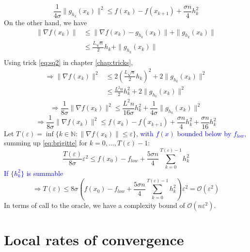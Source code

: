 \documentclass[12pt, openany]{report}
\renewcommand{\O}{\mathcal{O}}
\theoremstyle{definition}
\begin{document}
\begin{equation}
	\frac{1}{4\sigma} \|g_{h_k}(x_k)\|^2 \leq f(x_k) - f(x_{k+1}) + \frac{\sigma n}{4} h_k^2
\end{equation}
On the other hand, we have
\begin{equation}
	\begin{aligned}
		\|\nabla f(x_k)\| &\leq \|\nabla f(x_k) - g_{h_k}(x_k)\| + \|g_{h_k}(x_k)\|\\
		&\leq \frac{L \sqrt{n}}{2} h_k + \|g_{h_k}(x_k)\|\\
	\end{aligned}
\end{equation}
Using trick \eqref{eq:sq2} in chapter \ref{chap:tricks},
\begin{equation}
	\begin{aligned}
		\Longrightarrow \|\nabla f(x_k)\|^2 &\leq 2 \left( \frac{L \sqrt{n}}{2} h_k \right)^2 + 2 \|g_{h_k}(x_k)\|^2\\
		&\leq \frac{L^2 n}{2} h_k^2 + 2 \|g_{h_k}(x_k)\|^2 
	\end{aligned}
\end{equation}
\begin{equation}
	\Longrightarrow \frac{1}{8 \sigma} \|\nabla f(x_k)\|^2 \leq \frac{L^2n}{16\sigma} h_k^2 + \frac{1}{4\sigma} \|g_{h_k}(x_k)\|^2
\end{equation}
\begin{equation}\label{eq:brigitte}
	\Longrightarrow \frac{1}{8 \sigma} \|\nabla f(x_k)\|^2 \leq f(x_k) - f(x_{k+1}) + \frac{\sigma n}{4} h_k^2 + \frac{\sigma n}{16}h_k^2
\end{equation}
Let $T(\varepsilon) = \inf \{k\in \mathbb{N}: \|\nabla f(x_k)\| \leq \varepsilon \}$, \textcolor{blue}{with $f(x)$ bounded below by $f_{low}$}, summing up \eqref{eq:brigitte} for $k=0,\dots, T(\varepsilon)-1$:
\begin{equation}
	\frac{T(\varepsilon)}{8 \sigma} \varepsilon^2 \leq f(x_0) - f_{low} + \frac{5 \sigma n}{4} \sum_{k=0}^{T(\varepsilon)-1} h_k^2
\end{equation}
\textcolor{blue}{If $\{h_k^2\}$ is summable}
\begin{equation}
	\Longrightarrow T(\varepsilon) \leq 8 \sigma \left( f(x_0) - f_{low} + \frac{5 \sigma n}{4} \sum_{k=0}^{T(\varepsilon)-1} h_k^2\right) \varepsilon^2 = \O(\varepsilon^2)
\end{equation}
In terms of call to the oracle, we have a complexity bound of $\O(n\varepsilon^2)$.

\chapter{Local rates of convergence}
\end{document}
